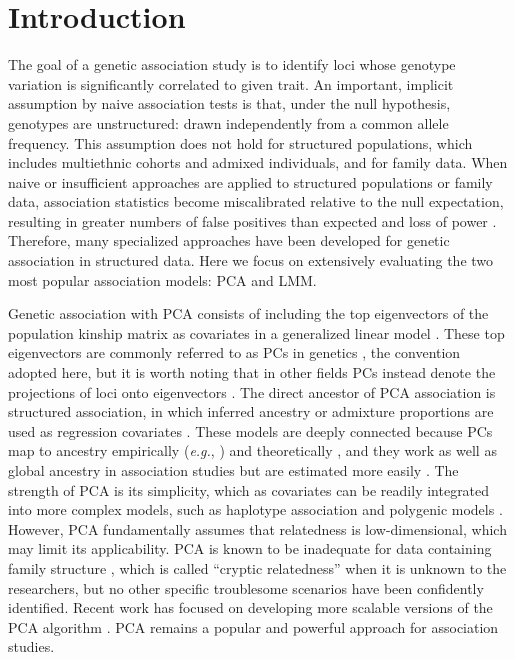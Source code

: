 \documentclass[11pt]{article}
\begin{document}
\section{Introduction} 

The goal of a genetic association study is to identify loci whose genotype variation is significantly correlated to given trait.
An important, implicit assumption by naive association tests is that, under the null hypothesis, genotypes are unstructured: drawn independently from a common allele frequency.
This assumption does not hold for structured populations, which includes multiethnic cohorts and admixed individuals, and for family data.
When naive or insufficient approaches are applied to structured populations or family data, association statistics become miscalibrated relative to the null expectation, resulting in greater numbers of false positives than expected and loss of power \citep{devlin_genomic_1999, voight_confounding_2005, astle_population_2009}.
Therefore, many specialized approaches have been developed for genetic association in structured data.
Here we focus on extensively evaluating the two most popular association models: PCA and LMM.

Genetic association with PCA consists of including the top eigenvectors of the population kinship matrix as covariates in a generalized linear model \citep{zhang_semiparametric_2003, price_principal_2006, bouaziz_accounting_2011}.
These top eigenvectors are commonly referred to as PCs in genetics \citep{patterson_population_2006}, the convention adopted here, but it is worth noting that in other fields PCs instead denote the projections of loci onto eigenvectors \citep{jolliffe_principal_2002}.
The direct ancestor of PCA association is structured association, in which inferred ancestry or admixture proportions are used as regression covariates \citep{pritchard_association_2000}.
These models are deeply connected because PCs map to ancestry empirically (\textit{e.g.}, \cite{alexander_fast_2009, zhou_strong_2016}) and theoretically \citep{mcvean_genealogical_2009,zheng_eigenanalysis_2016,cabreros_likelihood-free_2019,chiu_inferring_2022}, and they work as well as global ancestry in association studies but are estimated more easily \citep{patterson_population_2006, zhao_arabidopsis_2007, alexander_fast_2009, bouaziz_accounting_2011}.
The strength of PCA is its simplicity, which as covariates can be readily integrated into more complex models, such as haplotype association \citep{xu_detecting_2014} and polygenic models \citep{qian_fast_2020}.
However, PCA fundamentally assumes that relatedness is low-dimensional, which may limit its applicability.
PCA is known to be inadequate for data containing family structure \citep{patterson_population_2006, thornton_roadtrips:_2010, price_new_2010}, which is called ``cryptic relatedness'' when it is unknown to the researchers, but no other specific troublesome scenarios have been confidently identified.
Recent work has focused on developing more scalable versions of the PCA algorithm \citep{lee_sparse_2012, abraham_fast_2014, galinsky_fast_2016, abraham_flashpca2:_2017, agrawal_scalable_2020}.
PCA remains a popular and powerful approach for association studies.
\end{document}
